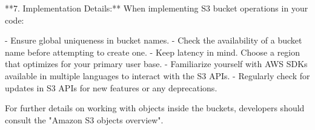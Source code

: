 **7. Implementation Details:**
When implementing S3 bucket operations in your code:

- Ensure global uniqueness in bucket names.
- Check the availability of a bucket name before attempting to create one.
- Keep latency in mind. Choose a region that optimizes for your primary user base.
- Familiarize yourself with AWS SDKs available in multiple languages to interact with the S3 APIs.
- Regularly check for updates in S3 APIs for new features or any deprecations.

For further details on working with objects inside the buckets, developers should consult the "Amazon S3 objects overview".
